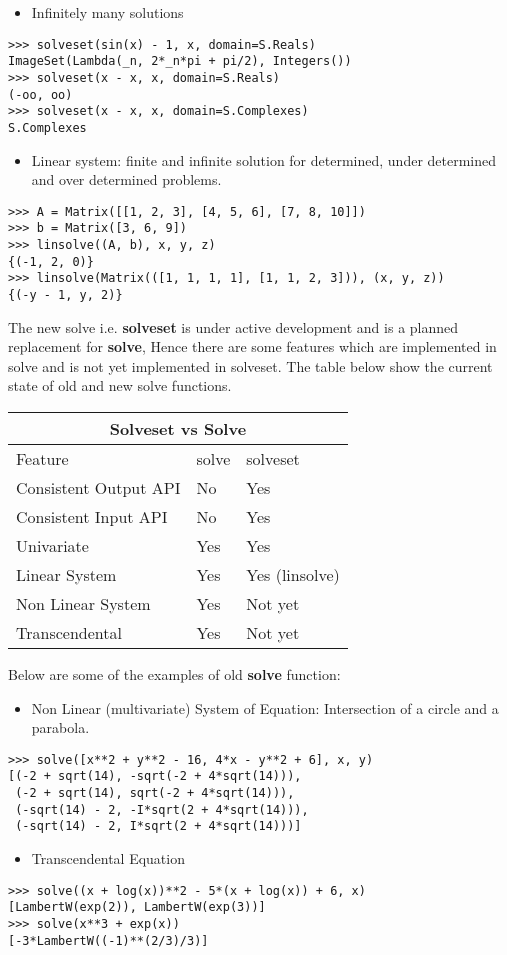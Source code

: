 \begin{itemize}
\item Infinitely many solutions
\end{itemize}
\begin{verbatim}
>>> solveset(sin(x) - 1, x, domain=S.Reals)
ImageSet(Lambda(_n, 2*_n*pi + pi/2), Integers())
>>> solveset(x - x, x, domain=S.Reals)
(-oo, oo)
>>> solveset(x - x, x, domain=S.Complexes)
S.Complexes

\end{verbatim}

\begin{itemize}
\item Linear system: finite and infinite solution for determined, under
determined and over determined problems.
\end{itemize}
\begin{verbatim}
>>> A = Matrix([[1, 2, 3], [4, 5, 6], [7, 8, 10]])
>>> b = Matrix([3, 6, 9])
>>> linsolve((A, b), x, y, z)
{(-1, 2, 0)}
>>> linsolve(Matrix(([1, 1, 1, 1], [1, 1, 2, 3])), (x, y, z))
{(-y - 1, y, 2)}

\end{verbatim}

The new solve i.e. \textbf{solveset} is under active development and is a
planned replacement for \textbf{solve}, Hence there are some features which are
implemented in solve and is not yet implemented in solveset. The table below
show the current state of old and new solve functions.

\hfill

\begin{tabular}{ |p{4cm}|p{3cm}|p{3cm}|  }
\hline
\multicolumn{3}{|c|}{Solveset vs Solve} \\
\hline
Feature& solve &solveset \\
\hline
Consistent Output API & No & Yes \\
Consistent Input API & No & Yes \\
Univariate & Yes & Yes\\
Linear System& Yes & Yes (linsolve) \\
Non Linear System& Yes & Not yet \\
Transcendental& Yes & Not yet \\
\hline
\end{tabular}

\hfill \break{}

Below are some of the examples of old \textbf{solve} function:

\begin{itemize}
\item Non Linear (multivariate) System of Equation: Intersection of a circle
and a parabola.
\end{itemize}
\begin{verbatim}
>>> solve([x**2 + y**2 - 16, 4*x - y**2 + 6], x, y)
[(-2 + sqrt(14), -sqrt(-2 + 4*sqrt(14))),
 (-2 + sqrt(14), sqrt(-2 + 4*sqrt(14))),
 (-sqrt(14) - 2, -I*sqrt(2 + 4*sqrt(14))),
 (-sqrt(14) - 2, I*sqrt(2 + 4*sqrt(14)))]

\end{verbatim}

\begin{itemize}
\item Transcendental Equation
\end{itemize}
\begin{verbatim}
>>> solve((x + log(x))**2 - 5*(x + log(x)) + 6, x)
[LambertW(exp(2)), LambertW(exp(3))]
>>> solve(x**3 + exp(x))
[-3*LambertW((-1)**(2/3)/3)]

\end{verbatim}
